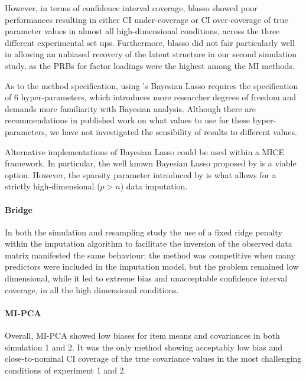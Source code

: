 	However, in terms of confidence interval coverage, blasso showed poor performances resulting in either CI 
	under-coverage or CI over-coverage of true parameter values in almost all high-dimensional conditions, 
	across the three different experimental set ups.
	Furthermore, blasso did not fair particularly well in allowing an unbiased recovery of the latent structure 
	in our second simulation study, as the PRBs for factor loadings were the highest among the MI methods.

	As to the method specification, using \cite{hans:2010}'s Bayesian Lasso requires the specification of 6 
	hyper-parameters, which introduces more researcher degrees of freedom and demands more familiarity with 
	Bayesian analysis.
	Although there are recommendations in published work on what values to use for these hyper-parameters,
	we have not investigated the sensibility of results to different values.
	
	Alternative implementations of Bayesian Lasso could be used within a MICE framework.
	In particular, the well known Bayesian Lasso proposed by \cite{parkCasella:2008} is a viable option.
	However, the sparsity parameter introduced by \cite{hans:2010} is what allows for a strictly high-dimensional 
	($p > n$) data imputation.

\paragraph{Bridge}
	In both the simulation and resampling study the use of a fixed ridge penalty within the imputation
	algorithm to facilitate the inversion of the observed data matrix manifested the same behaviour:
	the method was competitive when many predictors were included in the imputation model, but the problem
	remained low dimensional, while it led to extreme bias and unacceptable confidence interval coverage, 
	in all the high dimensional conditions.

\paragraph{MI-PCA}
	Overall, MI-PCA showed low biases for item means and covariances in both simulation 1 and 2.
	It was the only method showing acceptably low bias and close-to-nominal CI coverage of the true
	covariance values in the most challenging conditions of experiment 1 and 2.

